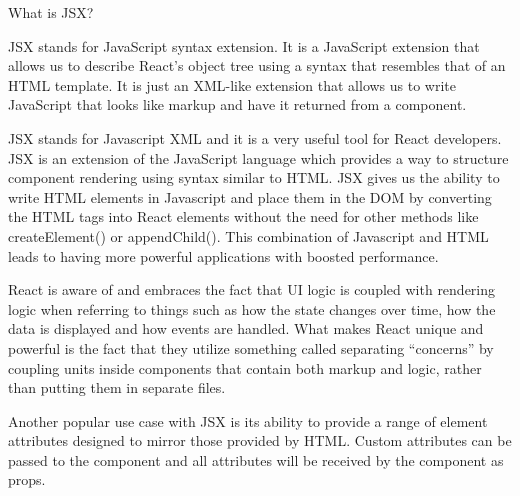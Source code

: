 What is JSX?

JSX stands for JavaScript syntax extension. It is a JavaScript extension that allows us to 
describe React's object tree using a syntax that resembles that of an HTML template. 
It is just an XML-like extension that allows us to write 
JavaScript that looks like markup and have it returned from a component.

JSX stands for Javascript XML and it is a very useful tool for React developers. 
JSX is an extension of the JavaScript language which provides a way to structure 
component rendering using syntax similar to HTML. JSX gives us the ability to write 
HTML elements in Javascript and place them in the DOM by converting the HTML tags 
into React elements without the need for other methods like createElement() or appendChild(). 
This combination of Javascript and HTML leads to having more powerful 
applications with boosted performance.

React is aware of and embraces the fact that UI logic is coupled with rendering logic 
when referring to things such as how the state changes over time, how the data is displayed 
and how events are handled. What makes React unique and powerful is the fact that they 
utilize something called separating “concerns” by coupling units inside components that 
contain both markup and logic, rather than putting them in separate files.

Another popular use case with JSX is its ability to provide a range of element 
attributes designed to mirror those provided by HTML. Custom attributes can be passed 
to the component and all attributes will be received by the component as props.